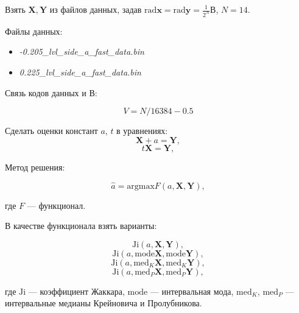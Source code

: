 \documentclass{article}
\begin{document}
  Взять \( \mathbf{X}, \mathbf{Y} \) из файлов данных, задав
  \( \text{rad} \mathbf{x} = \text{rad} \mathbf{y} = \frac{1}{2^N} \text{В} \),
  \( N = 14 \).

  Файлы данных:
  \begin{itemize}
    \item \emph{-0.205\_lvl\_side\_a\_fast\_data.bin}
    \item \emph{0.225\_lvl\_side\_a\_fast\_data.bin}
  \end{itemize}

  Связь кодов данных и В:

  \begin{equation*}
    V = N  / 16384 - 0.5
  \end{equation*}

  Сделать оценки констант \( a \), \( t \) в уравнениях:
  \begin{equation}
    \mathbf{X} + a = \mathbf{Y},
  \end{equation}
  \begin{equation}
    t\mathbf{X} = \mathbf{Y},
  \end{equation}

  Метод решения:

  \begin{equation}
    \hat a = \text{argmax} F(a, \mathbf{X}, \mathbf{Y}),
  \end{equation}

  где \( F \) --- функционал.

  В качестве функционала взять варианты:

  \begin{equation} \label{eq:F_1}
    \text{Ji} (a, \mathbf{X}, \mathbf{Y}),
  \end{equation}
  \begin{equation} \label{eq:F_2}
    \text{Ji} (a, \text{mode} \mathbf{X}, \text{mode} \mathbf{Y}),
  \end{equation}
  \begin{equation} \label{eq:F_3}
    \text{Ji} (a, \text{med}_K \mathbf{X}, \text{med}_K \mathbf{Y}),
  \end{equation}
  \begin{equation} \label{eq:F_4}
    \text{Ji} (a, \text{med}_P \mathbf{X}, \text{med}_P \mathbf{Y}),
  \end{equation}

  где \( \text{Ji} \) --- коэффициент Жаккара,
  \( \text{mode} \) --- интервальная мода,
  \( \text{med}_K \), \( \text{med}_P \) --- интервальные медианы Крейновича
  и Пролубникова.
\end{document}
